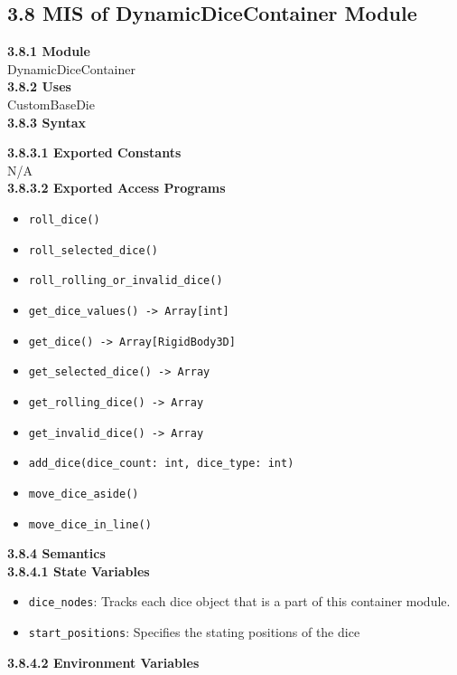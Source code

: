 \documentclass[12pt, titlepage]{article}
\begin{document}
\subsection*{3.8 MIS of DynamicDiceContainer Module}
\textbf{3.8.1 Module}\\
 DynamicDiceContainer\\

\noindent \textbf{3.8.2 Uses}\\
CustomBaseDie \\

\noindent \textbf{3.8.3 Syntax}

\noindent \textbf{3.8.3.1 Exported Constants}\\
N/A\\

\textbf{3.8.3.2 Exported Access Programs}
\begin{itemize}
	\item \texttt{roll\_dice() }
	\item \texttt{roll\_selected\_dice() }
	\item \texttt{roll\_rolling\_or\_invalid\_dice() }
	\item \texttt{get\_dice\_values() -> Array[int] }
	\item \texttt{get\_dice() -> Array[RigidBody3D]  }
	\item \texttt{get\_selected\_dice() -> Array }
	\item \texttt{get\_rolling\_dice() -> Array }
	\item \texttt{get\_invalid\_dice() -> Array  }
	\item \texttt{add\_dice(dice\_count: int, dice\_type: int)}
	\item \texttt{move\_dice\_aside() }
	\item \texttt{move\_dice\_in\_line() }
	
\end{itemize}

\noindent \textbf{3.8.4 Semantics}\\
\textbf{3.8.4.1 State Variables}\\
\begin{itemize}
	\item \texttt{dice\_nodes}: Tracks each dice object that is a part of this container module.
	\item \texttt{start\_positions}: Specifies the stating positions of the dice

\end{itemize}

\textbf{3.8.4.2 Environment Variables}\\
\end{document}
